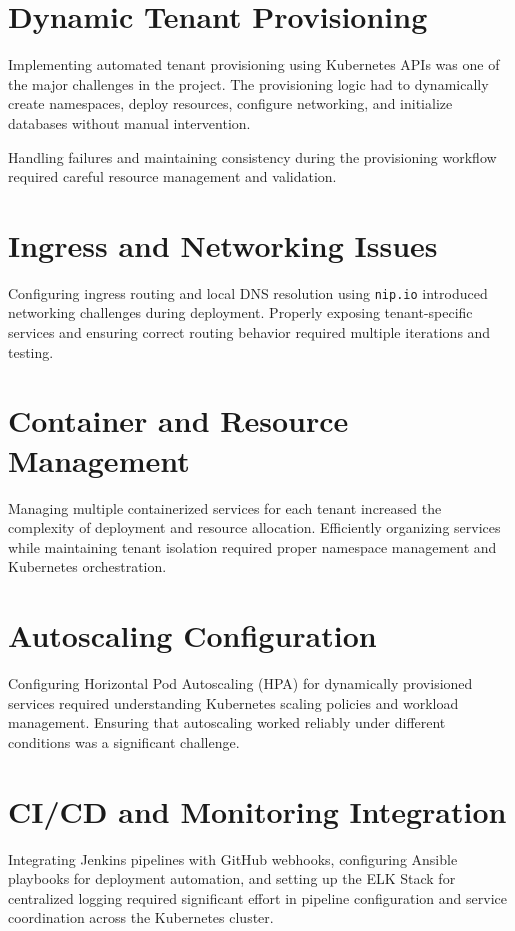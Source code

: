 \documentclass[12pt,a4paper]{report}
\begin{document}
\section{Dynamic Tenant Provisioning}

Implementing automated tenant provisioning using Kubernetes APIs was one of the major challenges in the project. The provisioning logic had to dynamically create namespaces, deploy resources, configure networking, and initialize databases without manual intervention.

Handling failures and maintaining consistency during the provisioning workflow required careful resource management and validation.

\section{Ingress and Networking Issues}

Configuring ingress routing and local DNS resolution using \texttt{nip.io} introduced networking challenges during deployment. Properly exposing tenant-specific services and ensuring correct routing behavior required multiple iterations and testing.

\section{Container and Resource Management}

Managing multiple containerized services for each tenant increased the complexity of deployment and resource allocation. Efficiently organizing services while maintaining tenant isolation required proper namespace management and Kubernetes orchestration.

\section{Autoscaling Configuration}

Configuring Horizontal Pod Autoscaling (HPA) for dynamically provisioned services required understanding Kubernetes scaling policies and workload management. Ensuring that autoscaling worked reliably under different conditions was a significant challenge.

\section{CI/CD and Monitoring Integration}

Integrating Jenkins pipelines with GitHub webhooks, configuring Ansible playbooks for deployment automation, and setting up the ELK Stack for centralized logging required significant effort in pipeline configuration and service coordination across the Kubernetes cluster.
\end{document}
